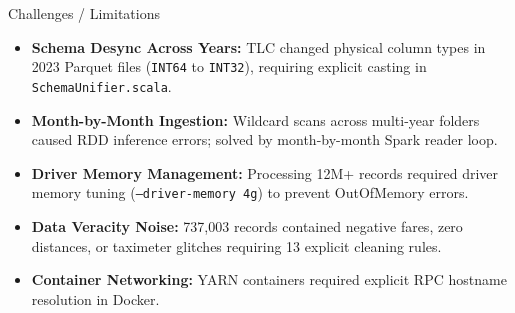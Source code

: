 \documentclass[aspectratio=169]{beamer}
\begin{document}
\begin{frame}{Challenges / Limitations}
  \begin{itemize}
    \item \textbf{Schema Desync Across Years:} TLC changed physical column types in 2023 Parquet files (\texttt{INT64} to \texttt{INT32}), requiring explicit casting in \texttt{SchemaUnifier.scala}.
    \addlinespace
    \item \textbf{Month-by-Month Ingestion:} Wildcard scans across multi-year folders caused RDD inference errors; solved by month-by-month Spark reader loop.
    \addlinespace
    \item \textbf{Driver Memory Management:} Processing 12M+ records required driver memory tuning (\texttt{--driver-memory 4g}) to prevent OutOfMemory errors.
    \addlinespace
    \item \textbf{Data Veracity Noise:} 737,003 records contained negative fares, zero distances, or taximeter glitches requiring 13 explicit cleaning rules.
    \addlinespace
    \item \textbf{Container Networking:} YARN containers required explicit RPC hostname resolution in Docker.
  \end{itemize}
\end{frame}
\end{document}
